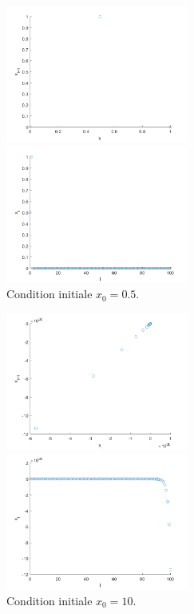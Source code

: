 \documentclass[a4paper, 12pt]{report}
\begin{document}
\begin{figure}[H]
    \centering
    \begin{minipage}[t]{6cm}
        \centering
        \includegraphics[width=6cm]{images/0dot5_x_i_x_i_plus_1.png}
    \end{minipage}\hspace{1cm}
    \begin{minipage}[t]{6cm}
        \centering
        \includegraphics[width=6cm]{images/0dot5_i_x_i.png}
    \end{minipage}
    \caption{Condition initiale $x_0 = 0.5$.}
\end{figure}

\begin{figure}[H]
    \centering
    \begin{minipage}[t]{6cm}
        \centering
        \includegraphics[width=6cm]{images/10_x_i_x_i_plus_1.png}
    \end{minipage}\hspace{1cm}
    \begin{minipage}[t]{6cm}
        \centering
        \includegraphics[width=6cm]{images/10_i_x_i.png}
    \end{minipage}
    \caption{Condition initiale $x_0 = 10$.}
\end{figure}
\end{document}
